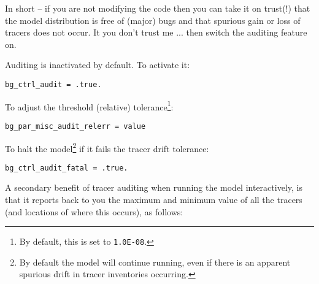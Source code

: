 \documentclass[11pt,fleqn]{book} %
\begin{document}
In short -- if you are not modifying the code then you can take it on trust(!) that the model distribution is free of (major) bugs and that spurious gain or loss of tracers does not occur. It you don't trust me ... then switch the auditing feature on.

Auditing is inactivated by default. To activate it:
\vspace{-2mm}\small\begin{verbatim}
bg_ctrl_audit = .true.
\end{verbatim}\normalsize\vspace{-2mm}

To adjust the threshold (relative) tolerance\footnote{By default, this is set to \texttt{1.0E-08}.}:
\vspace{-2mm}\small\begin{verbatim}
bg_par_misc_audit_relerr = value
\end{verbatim}\normalsize\vspace{-2mm}

To halt the model\footnote{By default the model will continue running, even if there is an apparent spurious drift in tracer inventories occurring.} if it fails the tracer drift tolerance:
\vspace{-2mm}\small\begin{verbatim}
bg_ctrl_audit_fatal = .true.
\end{verbatim}\normalsize\vspace{-2mm}

A secondary benefit of tracer auditing when running the model interactively, is that it reports back to you the maximum and minimum value of all the tracers (and locations of where this occurs), as follows:
\end{document}
